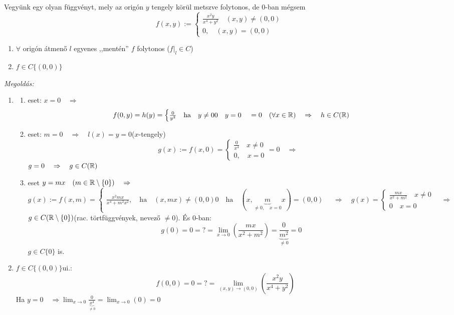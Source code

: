 \documentclass[a4paper,11.5pt]{article}
\begin{document}
	\begin{task}
		Vegyünk egy olyan függvényt, mely az origón $y$ tengely körül metszve folytonos, de 0-ban mégsem
		\[ f(x,y):=\begin{cases}
			\frac{x^2y}{x^4+y^2}\quad (x,y)\not=(0,0)\\
			0,\quad (x,y)=(0,0)
		\end{cases} \]
		\begin{enumerate}
			\item $\forall$ origón átmenő $l$ egyenes ,,mentén'' $f$ folytonos ($f|_l\in C$)
			\item $f\in C\{ (0,0) \}$
		\end{enumerate}
		\textit{Megoldás:}
		\begin{enumerate}
			\item\begin{enumerate}
				\item eset: $x=0\quad \Rightarrow\quad $
				\[ f(0,y)=h(y)=\begin{cases}
					\frac{0}{y^2}\quad \text{ha}\quad y\not=0
					0\quad y=0
				\end{cases}=0\quad (\forall x\in\mathbb{R})\quad \Rightarrow\quad h\in C(\mathbb{R}) \]
				\item eset: $m=0\quad \Rightarrow\quad l(x)=y=0$\quad ($x$-tengely)
				\[ g(x):=f(x,0)=\begin{cases}
					\frac{0}{x^4}\quad x\not=0\\
					0,\quad x=0
				\end{cases}=0\quad \Rightarrow\quad  \]
				$g=0\quad \Rightarrow\quad g\in C(\mathbb{R})$
				\item eset $y=mx\quad (m\in\mathbb{R}\setminus\{0\})\quad \Rightarrow$
				\[ g(x):=f(x,m)=\begin{cases}
					\frac{x^2mx}{x^4+m^2x^2},\quad \text{ha}\quad (x,mx)\not=(0,0)
					0\quad \text{ha}\quad (x,\underbrace{m}_{\not=0,\quad x=0}x)=(0,0)
				\end{cases}\quad \Rightarrow\quad g(x)=\begin{cases}
					\frac{mx}{x^2+m^2}\quad x\not=0\\
					0\quad x=0
				\end{cases}\quad \Rightarrow\quad   \]
				$g\in C(\mathbb{R}\setminus\{0\})$\quad (rac. törtfüggvények, nevező $\not=0$). És 0-ban:
				\[ g(0)=0=?=\lim_{x\to0}\left(\frac{mx}{x^2+m^2}\right)=\frac{0}{\underbrace{m^2}_{\not=0}}=0 \]
				$g\in C\{0\}$ is.
			\end{enumerate}
			\item $f\in C\{ (0,0) \}$\quad ui.:
			\[ f(0,0)=0=?=\lim_{(x,y)\to(0,0)}\left(\frac{x^2y}{x^4+y^2}\right) \]
			Ha $y=0\quad \Rightarrow\lim_{x\to0}\frac{0}{\underbrace{x^4}_{\not=0}}=\lim_{x\to0}(0)=0$
			

\end{enumerate}
\end{task}
\end{document}
